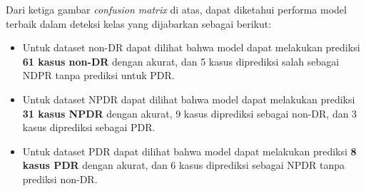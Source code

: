 Dari ketiga gambar \emph{confusion matrix} di atas, dapat diketahui performa model terbaik dalam deteksi kelas yang dijabarkan sebagai berikut:

\begin{itemize}
	\item Untuk dataset non-DR dapat dilihat bahwa model dapat melakukan prediksi \textbf{61 kasus non-DR} dengan akurat, dan 5 kasus diprediksi salah sebagai NDPR tanpa prediksi untuk PDR.
	
	\item Untuk dataset NPDR dapat dilihat bahwa model dapat melakukan prediksi \textbf{31 kasus NPDR} dengan akurat, 9 kasus diprediksi sebagai non-DR, dan 3 kasus diprediksi sebagai PDR.
	
	\item Untuk dataset PDR dapat dilihat bahwa model dapat melakukan prediksi \textbf{8 kasus PDR} dengan akurat, dan 6 kasus diprediksi sebagai NPDR tanpa prediksi non-DR.
\end{itemize}
\pagebreak

